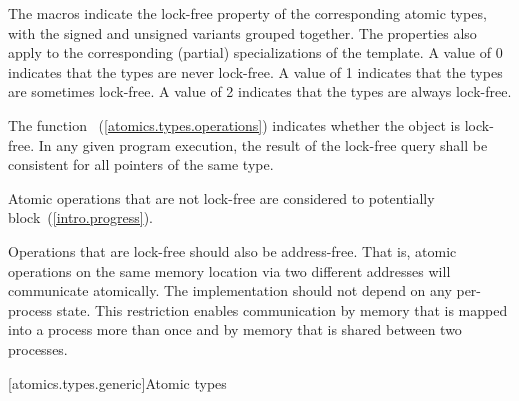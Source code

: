 \pnum
The  macros indicate the lock-free property of the
corresponding atomic types, with the signed and unsigned variants grouped
together. The properties also apply to the corresponding (partial) specializations of the
 template. A value of 0 indicates that the types are never
lock-free. A value of 1 indicates that the types are sometimes lock-free. A
value of 2 indicates that the types are always lock-free.

\pnum
The function ~(\ref{atomics.types.operations})
indicates whether the object is lock-free. In any given program execution, the
result of the lock-free query shall be consistent for all pointers of the same
type.

\pnum
Atomic operations that are not lock-free are considered to potentially
block~(\ref{intro.progress}).

\pnum
\begin{note} Operations that are lock-free should also be address-free. That is,
atomic operations on the same memory location via two different addresses will
communicate atomically. The implementation should not depend on any
per-process state. This restriction enables communication  by memory that is
mapped into a process more than once and by memory that is shared between two
processes. \end{note}

[atomics.types.generic]{Atomic types}

